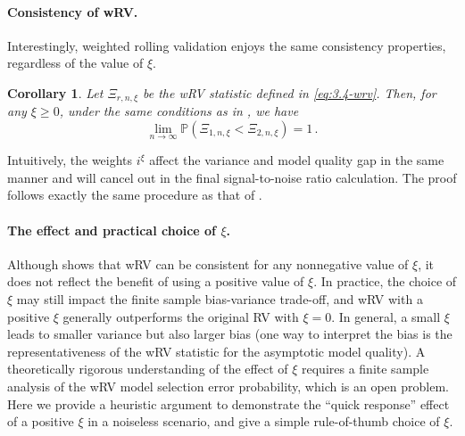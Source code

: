 \documentclass[11pt]{article}
\theoremstyle{plain}
\newtheorem{corollary}[theorem]{Corollary}
\begin{document}
\paragraph{Consistency of wRV.} Interestingly, weighted rolling validation enjoys the same consistency properties, regardless of the value of $\xi$.
\begin{corollary}
    \label{cor:3.4-wrv-consistency}
    Let $\Xi_{r,n,\xi}$ be the wRV statistic defined in \eqref{eq:3.4-wrv}. Then, for any $\xi\ge 0$, under the same conditions as in , we have
    $$\lim_{n\rightarrow\infty}\mathbb P(\Xi_{1,n,\xi}<\Xi_{2,n,\xi})=1\,.$$
\end{corollary}
Intuitively, the weights $i^\xi$ affect the variance and model quality gap in the same manner and will cancel out in the final signal-to-noise ratio calculation.  The proof follows exactly the same procedure as that of .

\paragraph{The effect and practical choice of $\xi$.}
Although  shows that wRV can be consistent for any nonnegative value of $\xi$, it does not reflect the benefit of using a positive value of $\xi$.
In practice, the choice of $\xi$ may still impact the finite sample bias-variance trade-off,  and wRV with a positive $\xi$ generally outperforms the original RV with $\xi=0$.  In general, a small $\xi$ leads to smaller variance but also larger bias (one way to interpret the bias is the 
representativeness of the wRV statistic for the asymptotic model quality).  A theoretically rigorous understanding of the effect of $\xi$ requires a finite sample analysis of the wRV model selection error probability, which is an open problem. Here we provide a heuristic argument to demonstrate the ``quick 
response'' effect of a positive $\xi$ in a noiseless scenario, and give a 
simple rule-of-thumb choice of $\xi$.
\end{document}
